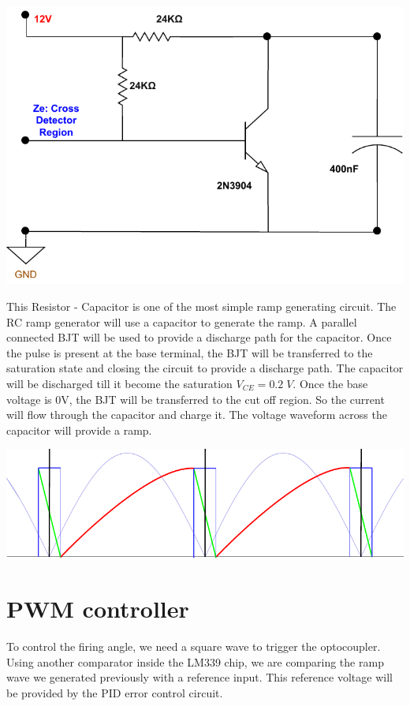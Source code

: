 \begin{multicols}{2}
\begin{minipage}{0.45\textwidth}
\centering
\includegraphics[width=\textwidth]{Method/Ramp gen cropped.pdf}
\end{minipage}

This Resistor - Capacitor is one of the most simple ramp generating circuit. The RC ramp generator will use a  capacitor to generate the ramp. A parallel connected BJT will be used to provide a discharge path for the capacitor. Once the pulse is present at the base terminal, the BJT will be transferred to the saturation state and closing the circuit to provide a discharge path. The capacitor will be discharged till it become the saturation $V_{CE}=0.2 \; V$. Once the base voltage is 0V, the BJT will be transferred to the cut off region. So the current will flow through the capacitor and charge it. The voltage waveform across the capacitor will provide a ramp.

\begin{minipage}{0.45\textwidth}
\centering
\includegraphics[width=\textwidth]{Method/Zero-ramp function with ramp.pdf}
\end{minipage}

\section{PWM controller}
To control the firing angle, we need a square wave to trigger the optocoupler. Using another comparator inside the LM339 chip, we are comparing the ramp wave we generated previously with a reference input. This reference voltage will be provided by the PID error control circuit. 


\end{multicols}
